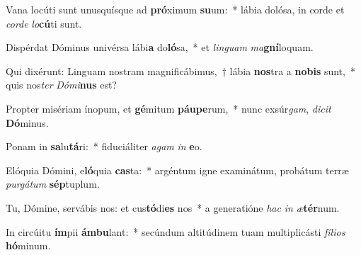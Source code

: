 \item Vana locúti sunt unusquísque ad \textbf{pró}ximum \textbf{su}um:~* lábia dolósa, in corde et \textit{cor}\textit{de} \textit{lo}\textbf{cú}ti sunt.
\item Dispérdat Dóminus univérsa lábi\textbf{a} do\textbf{ló}sa,~* et \textit{lin}\textit{guam} \textit{ma}\textbf{gní}loquam.
\item Qui dixérunt: Linguam nostram magnificábimus,~† lábia \textbf{nos}tra a \textbf{no}\textbf{bis} sunt,~* quis nos\textit{ter} \textit{Dó}\textit{mi}\textbf{nus} est?
\item Propter misériam ínopum, et \textbf{gé}mitum \textbf{páu}\textbf{pe}rum,~* nunc exsúr\textit{gam}, \textit{di}\textit{cit} \textbf{Dó}minus.
\item Ponam in \textbf{sa}lu\textbf{tá}ri:~* fiduciáliter \textit{a}\textit{gam} \textit{in} \textbf{e}o.
\item Elóquia Dómini, e\textbf{ló}quia \textbf{cas}ta:~* argéntum igne examinátum, probátum terræ \textit{pur}\textit{gá}\textit{tum} \textbf{sép}tuplum.
\item Tu, Dómine, servábis nos: et cus\textbf{tó}di\textbf{es} nos~* a generatióne \textit{hac} \textit{in} \textit{æ}\textbf{tér}num.
\item In circúitu \textbf{ím}pii \textbf{ám}\textbf{bu}lant:~* secúndum altitúdinem tuam multiplicásti \textit{fí}\textit{li}\textit{os} \textbf{hó}minum.
